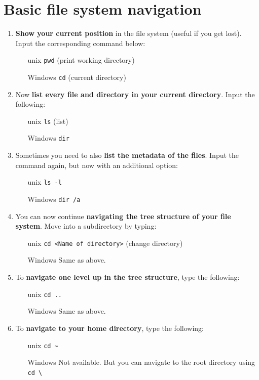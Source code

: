 \documentclass{scrreprt}
\begin{document}
\section{Basic file system navigation}
\begin{enumerate}
\item \textbf{Show your current position} in the file system (useful if you get lost). Input the corresponding command below:
\begin{itemize}
\item[unix] \texttt{pwd} (print working directory) 
\item[Windows] \texttt{cd} (current directory)
\end{itemize}
\item Now \textbf{list every file and directory in your current directory}. Input the following:
\begin{itemize}
\item[unix] \texttt{ls} (list) 
\item[Windows] \texttt{dir}
\end{itemize}
\item Sometimes you need to also \textbf{list the metadata of the files}. Input the command again, but now with an additional option:
\begin{itemize}
\item[unix] \texttt{ls -l}
\item[Windows] \texttt{dir /a}
\end{itemize}
\item You can now continue \textbf{navigating the tree structure of your file system}. Move into a subdirectory by typing:
\begin{itemize}
\item[unix] \texttt{cd <Name of directory>} (change directory) 
\item[Windows] Same as above.
\end{itemize}
\item To \textbf{navigate one level up in the tree structure}, type the following:
\begin{itemize}
\item[unix] \texttt{cd ..}
\item[Windows] Same as above.
\end{itemize}
\item To \textbf{navigate to your home directory}, type the following:
\begin{itemize}
\item[unix] \texttt{cd \textasciitilde}
\item[Windows] Not available. But you can navigate to the root directory using \texttt{cd \textbackslash}
\end{itemize}
\end{enumerate}
\end{document}
